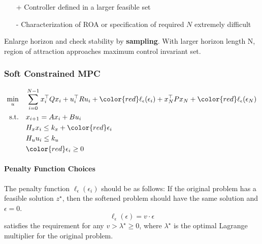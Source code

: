 \newpar{}

\begin{itemize}
    \item [+] Controller defined in a larger feasible set
    \item [-] Characterization of ROA or specification of required $N$ extremely difficult
\end{itemize}

\newpar{}

Enlarge horizon and check stability by \textbf{sampling}.
\newpar{}
With larger horizon length N, region of attraction approaches maximum control invariant set.

\subsubsection{Soft Constrained MPC}
\noindent
\begin{align*}
    \min_u \quad      & \sum_{i=0}^{N-1} x_i^\top Q x_i + u_i^\top R u_i +  {\color{red}\ell_\epsilon(\epsilon_i)} + x_N^\top P x_N + {\color{red}\ell_\epsilon(\epsilon_N)} \\
    \text{s.t.} \quad & x_{i+1} = A x_i + B u_i                                                                                                                              \\
                      & H_x x_i \leq k_x + {\color{red}\epsilon_i}                                                                                                           \\
                      & H_u u_i \leq k_u                                                                                                                                     \\
                      & {\color{red}\epsilon_i \geq 0}
\end{align*}

\paragraph{Penalty Function Choices}

The penalty function $\ell_\epsilon(\epsilon_i)$ should be as follows: If the original problem has a feasible solution $z^\star$, then the softened problem should have the same solution and $\epsilon = 0$.
\newpar{}
\begin{equation*}
    \ell_\epsilon(\epsilon) = v \cdot \epsilon
\end{equation*}
satisfies the requirement for any $v > \lambda^\star \geq 0$, where $\lambda^\star$ is the optimal Lagrange multiplier for the original problem.
\newpar{}

